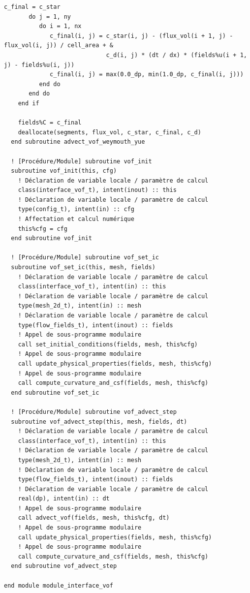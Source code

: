 \documentclass[10pt,a4paper,oneside]{book}
\begin{document}
\begin{lstlisting}[language={[95]Fortran}]
       c_final = c_star
       do j = 1, ny
          do i = 1, nx
             c_final(i, j) = c_star(i, j) - (flux_vol(i + 1, j) - flux_vol(i, j)) / cell_area + &
                             c_d(i, j) * (dt / dx) * (fields%u(i + 1, j) - fields%u(i, j))
             c_final(i, j) = max(0.0_dp, min(1.0_dp, c_final(i, j)))
          end do
       end do
    end if

    fields%C = c_final
    deallocate(segments, flux_vol, c_star, c_final, c_d)
  end subroutine advect_vof_weymouth_yue

  ! [Procédure/Module] subroutine vof_init
  subroutine vof_init(this, cfg)
    ! Déclaration de variable locale / paramètre de calcul
    class(interface_vof_t), intent(inout) :: this
    ! Déclaration de variable locale / paramètre de calcul
    type(config_t), intent(in) :: cfg
    ! Affectation et calcul numérique
    this%cfg = cfg
  end subroutine vof_init

  ! [Procédure/Module] subroutine vof_set_ic
  subroutine vof_set_ic(this, mesh, fields)
    ! Déclaration de variable locale / paramètre de calcul
    class(interface_vof_t), intent(in) :: this
    ! Déclaration de variable locale / paramètre de calcul
    type(mesh_2d_t), intent(in) :: mesh
    ! Déclaration de variable locale / paramètre de calcul
    type(flow_fields_t), intent(inout) :: fields
    ! Appel de sous-programme modulaire
    call set_initial_conditions(fields, mesh, this%cfg)
    ! Appel de sous-programme modulaire
    call update_physical_properties(fields, mesh, this%cfg)
    ! Appel de sous-programme modulaire
    call compute_curvature_and_csf(fields, mesh, this%cfg)
  end subroutine vof_set_ic

  ! [Procédure/Module] subroutine vof_advect_step
  subroutine vof_advect_step(this, mesh, fields, dt)
    ! Déclaration de variable locale / paramètre de calcul
    class(interface_vof_t), intent(in) :: this
    ! Déclaration de variable locale / paramètre de calcul
    type(mesh_2d_t), intent(in) :: mesh
    ! Déclaration de variable locale / paramètre de calcul
    type(flow_fields_t), intent(inout) :: fields
    ! Déclaration de variable locale / paramètre de calcul
    real(dp), intent(in) :: dt
    ! Appel de sous-programme modulaire
    call advect_vof(fields, mesh, this%cfg, dt)
    ! Appel de sous-programme modulaire
    call update_physical_properties(fields, mesh, this%cfg)
    ! Appel de sous-programme modulaire
    call compute_curvature_and_csf(fields, mesh, this%cfg)
  end subroutine vof_advect_step

end module module_interface_vof

\end{lstlisting}
\end{document}
